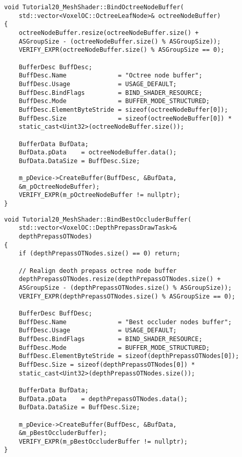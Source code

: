 \begin{lstlisting}
void Tutorial20_MeshShader::BindOctreeNodeBuffer(
    std::vector<VoxelOC::OctreeLeafNode>& octreeNodeBuffer)
{
    octreeNodeBuffer.resize(octreeNodeBuffer.size() + 
    ASGroupSize - (octreeNodeBuffer.size() % ASGroupSize));
    VERIFY_EXPR(octreeNodeBuffer.size() % ASGroupSize == 0);

    BufferDesc BuffDesc;
    BuffDesc.Name              = "Octree node buffer";
    BuffDesc.Usage             = USAGE_DEFAULT;
    BuffDesc.BindFlags         = BIND_SHADER_RESOURCE;
    BuffDesc.Mode              = BUFFER_MODE_STRUCTURED;
    BuffDesc.ElementByteStride = sizeof(octreeNodeBuffer[0]);
    BuffDesc.Size              = sizeof(octreeNodeBuffer[0]) * 
    static_cast<Uint32>(octreeNodeBuffer.size());

    BufferData BufData;
    BufData.pData    = octreeNodeBuffer.data();
    BufData.DataSize = BuffDesc.Size;

    m_pDevice->CreateBuffer(BuffDesc, &BufData, 
    &m_pOctreeNodeBuffer);
    VERIFY_EXPR(m_pOctreeNodeBuffer != nullptr);
}
\end{lstlisting}

\begin{lstlisting}
void Tutorial20_MeshShader::BindBestOccluderBuffer(
    std::vector<VoxelOC::DepthPrepassDrawTask>& 
    depthPrepassOTNodes)
{
    if (depthPrepassOTNodes.size() == 0) return;

    // Realign deoth prepass octree node buffer
    depthPrepassOTNodes.resize(depthPrepassOTNodes.size() + 
    ASGroupSize - (depthPrepassOTNodes.size() % ASGroupSize));
    VERIFY_EXPR(depthPrepassOTNodes.size() % ASGroupSize == 0);

    BufferDesc BuffDesc;
    BuffDesc.Name              = "Best occluder nodes buffer";
    BuffDesc.Usage             = USAGE_DEFAULT;
    BuffDesc.BindFlags         = BIND_SHADER_RESOURCE;
    BuffDesc.Mode              = BUFFER_MODE_STRUCTURED;
    BuffDesc.ElementByteStride = sizeof(depthPrepassOTNodes[0]);
    BuffDesc.Size = sizeof(depthPrepassOTNodes[0]) * 
    static_cast<Uint32>(depthPrepassOTNodes.size());

    BufferData BufData;
    BufData.pData    = depthPrepassOTNodes.data();
    BufData.DataSize = BuffDesc.Size;

    m_pDevice->CreateBuffer(BuffDesc, &BufData, 
    &m_pBestOccluderBuffer);
    VERIFY_EXPR(m_pBestOccluderBuffer != nullptr);
}
\end{lstlisting}

